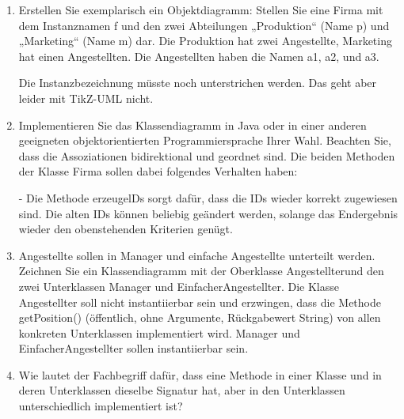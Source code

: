 \documentclass{lehramt-informatik-aufgabe}
\begin{document}
\begin{enumerate}


\item Erstellen Sie exemplarisch ein Objektdiagramm: Stellen Sie eine
Firma mit dem Instanznamen f und den zwei Abteilungen „Produktion“ (Name
p) und „Marketing“ (Name m) dar. Die Produktion hat zwei Angestellte,
Marketing hat einen Angestellten. Die Angestellten haben die Namen a1,
a2, und a3.

\begin{liAntwort}
Die Instanzbezeichnung müsste noch unterstrichen werden. Das geht aber
leider mit TikZ-UML nicht.
\begin{center}
\end{center}
\end{liAntwort}


\item Implementieren Sie das Klassendiagramm in Java oder in einer
anderen geeigneten objektorientierten Programmiersprache Ihrer Wahl.
Beachten Sie, dass die Assoziationen bidirektional und geordnet sind.
Die beiden Methoden der Klasse Firma sollen dabei folgendes Verhalten
haben:

- Die Methode erzeugelDs sorgt dafür, dass die IDs wieder korrekt
zugewiesen sind. Die alten IDs können beliebig geändert werden, solange
das Endergebnis wieder den obenstehenden Kriterien genügt.


\item Angestellte sollen in Manager und einfache Angestellte unterteilt
werden. Zeichnen Sie ein Klassendiagramm mit der Oberklasse
Angestellterund den zwei Unterklassen Manager und EinfacherAngestellter.
Die Klasse Angestellter soll nicht instantiierbar sein und erzwingen,
dass die Methode getPosition() (öffentlich, ohne Argumente, Rückgabewert
String) von allen konkreten Unterklassen implementiert wird. Manager und
EinfacherAngestellter sollen instantiierbar sein.


\item Wie lautet der Fachbegriff dafür, dass eine Methode in einer
Klasse und in deren Unterklassen dieselbe Signatur hat, aber in den
Unterklassen unterschiedlich implementiert ist?

\end{enumerate}
\end{document}
